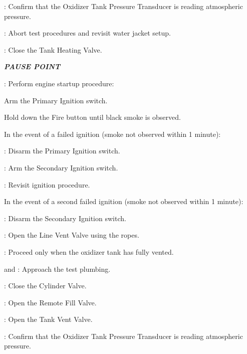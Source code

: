\begin{checklist}
\begin{checklist}[label=$\bullet$]
\begin{checklist}
            \item \daq{}: Confirm that the Oxidizer Tank Pressure Transducer is reading atmospheric pressure.
            \item \ops{}: Abort test procedures and revisit water jacket setup.
        \end{checklist}
    \end{checklist}
    \item \heat: Close the Tank Heating Valve.
    \item \textbf{\textit{PAUSE POINT}}
    \item \primary{}: Perform engine startup procedure:
    \begin{checklist}
        \item Arm the Primary Ignition switch.
        \item Hold down the Fire button until black smoke is observed.
        \begin{checklist}[label=$\bullet$]
            \item In the event of a failed ignition (smoke not observed within 1 minute):
            \begin{checklist}
                \item \primary: Disarm the Primary Ignition switch.
                \item \primary: Arm the Secondary Ignition switch.
                \item \ops: Revisit ignition procedure.
            \end{checklist}
            \item In the event of a second failed ignition (smoke not observed within 1 minute):
            \begin{checklist}
                \item \primary: Disarm the Secondary Ignition switch.
                \item \primary: Open the Line Vent Valve using the ropes.
                \item \ops: Proceed only when the oxidizer tank has fully vented.
                \item \primary{} and \secondary: Approach the test plumbing.
                \item \primary{}: Close the Cylinder Valve.
                \item \primary{}: Open the Remote Fill Valve.
                \item \primary{}: Open the Tank Vent Valve.
                \item \daq{}: Confirm that the Oxidizer Tank Pressure Transducer is reading atmospheric pressure.

\end{checklist}
\end{checklist}
\end{checklist}
\end{checklist}
